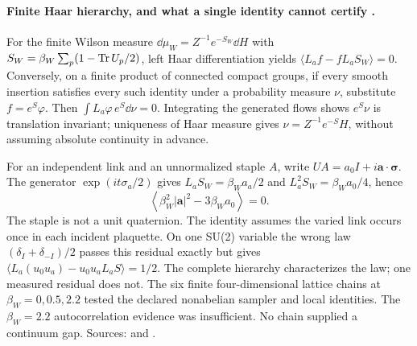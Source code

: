\paragraph{Finite Haar hierarchy, and what a single identity cannot certify \workstar.}
For the finite Wilson measure \(\dd\mu_W=Z^{-1}e^{-S_W}\dd H\) with
\(S_W=\beta_W\sum_p(1-\operatorname{Tr} U_p/2)\), left Haar differentiation yields
\(\langle L_af-fL_aS_W\rangle=0\).  Conversely, on a finite product of
connected compact groups, if every smooth insertion satisfies every such
identity under a probability measure \(\nu\), substitute \(f=e^S\varphi\).
Then \(\int L_a\varphi\,e^S\dd\nu=0\).  Integrating the generated flows
shows \(e^S\nu\) is translation invariant; uniqueness of Haar measure gives
\(\nu=Z^{-1}e^{-S}H\), without assuming absolute continuity in advance.

For an independent link and an unnormalized staple \(A\), write
\(UA=a_0I+i\boldsymbol a\cdot\boldsymbol\sigma\).  The generator
\(\exp(it\sigma_a/2)\) gives \(L_aS_W=\beta_Wa_a/2\) and
\(L_a^2S_W=\beta_Wa_0/4\), hence
\begin{equation}
 \left\langle\beta_W^2|\boldsymbol a|^2-3\beta_Wa_0\right\rangle=0.
 \label{early:ward}
\end{equation}
The staple is not a unit quaternion.  The identity assumes the varied link
occurs once in each incident plaquette.  On one SU(2) variable the wrong law
\((\delta_I+\delta_{-I})/2\) passes this residual exactly but gives
\(\langle L_a(u_0u_a)-u_0u_aL_aS\rangle=1/2\).
The complete hierarchy characterizes the law; one measured residual does not.
The six finite four-dimensional lattice chains at \(\beta_W=0,0.5,2.2\)
tested the declared nonabelian sampler and local identities.  The
\(\beta_W=2.2\) autocorrelation evidence was insufficient.  No chain supplied
a continuum gap.  Sources:  and
.

